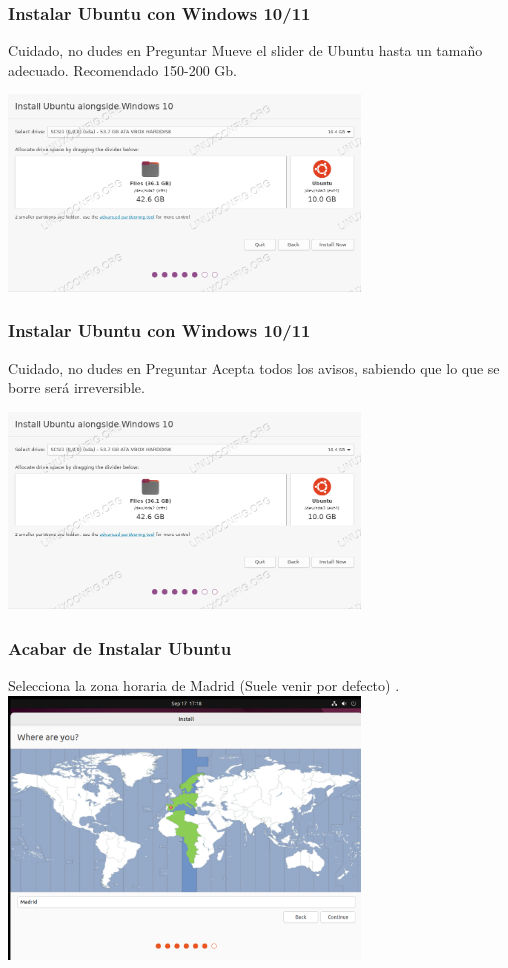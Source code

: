 \documentclass[10pt]{beamer}
\begin{document}
	\begin{frame}
		\frametitle{Instalar Ubuntu con Windows 10/11}
		\begin{alertblock}{Cuidado, no dudes en Preguntar}
			Mueve el slider de Ubuntu hasta un tamaño adecuado. Recomendado 150-200 Gb.
		\end{alertblock}
		
		\includegraphics[width=0.7\textwidth]{windows-10-2}
	\end{frame}
	
	\begin{frame}
		\frametitle{Instalar Ubuntu con Windows 10/11}
		\begin{alertblock}{Cuidado, no dudes en Preguntar}
			Acepta todos los avisos, sabiendo que lo que se borre será irreversible.
		\end{alertblock}
		
		\includegraphics[width=0.7\textwidth]{windows-10-2}
	\end{frame}
	
	\begin{frame}
		\frametitle{Acabar de Instalar Ubuntu}
		Selecciona la zona horaria de Madrid (Suele venir por defecto)
		.
		\includegraphics[width=0.7\textwidth]{timezone}
	\end{frame}
	
\end{document}

